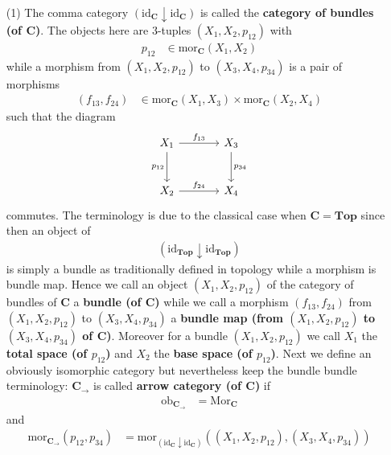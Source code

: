 \begin{enumerate}
\item[(1)]
The comma category $(\mathrm{id}_{\mathbf{C}} \downarrow \mathrm{id}_{\mathbf{C}})$ is called the \textbf{category of bundles (of $\mathbf{C}$)}. The objects here are $3$-tuples $(X_{1},X_{2},p_{12})$ with
\begin{align*}
  p_{12}
  &\in
  \mathrm{mor}_{\mathbf{C}}(X_{1},X_{2})
\end{align*}
while a morphism from $(X_{1},X_{2},p_{12})$ to $(X_{3},X_{4},p_{34})$ is a pair of morphisms
\begin{align*}
  (f_{13},f_{24})
  &\in
  \mathrm{mor}_{\mathbf{C}}(X_{1},X_{3})
  \times
  \mathrm{mor}_{\mathbf{C}}(X_{2},X_{4})
\end{align*}
such that the diagram
\[
\begin{tikzcd}[sep=large]
  X_{1}
  \arrow{r}{f_{13}}
  \arrow[swap]{d}{p_{12}}
  &
  X_{3}
  \arrow{d}{p_{34}}
  \\
  X_{2}
  \arrow{r}{f_{24}}
  &
  X_{4}
\end{tikzcd}
\]
commutes. The terminology is due to the classical case when $\mathbf{C} = \mathbf{Top}$ since then an object of
\begin{align*}
  (\mathrm{id}_{\mathbf{Top}} \downarrow \mathrm{id}_{\mathbf{Top}})
\end{align*}
is simply a bundle as traditionally defined in topology while a morphism is bundle map. Hence we call an object $(X_{1},X_{2},p_{12})$ of the category of bundles of $\mathbf{C}$ a \textbf{bundle (of $\mathbf{C}$)} while we call a morphism $(f_{13},f_{24})$ from $(X_{1},X_{2},p_{12})$ to $(X_{3},X_{4},p_{34})$ a \textbf{bundle map (from $(X_{1},X_{2},p_{12})$ to $(X_{3},X_{4},p_{34})$ of $\mathbf{C}$)}. Moreover for a bundle $(X_{1},X_{2},p_{12})$ we call $X_{1}$ the \textbf{total space (of $p_{12}$)} and $X_{2}$ the \textbf{base space (of $p_{12}$)}. Next we define an obviously isomorphic category but nevertheless keep the bundle bundle terminology: $\mathbf{C}_{\rightarrow}$ is called \textbf{arrow category (of $\mathbf{C}$)} if
\begin{align*}
  \mathrm{ob}_{\mathbf{C}_{\rightarrow}}
  &=
  \mathrm{Mor}_{\mathbf{C}}
\end{align*}
and
\begin{align*}
  \mathrm{mor}_{\mathbf{C}_{\rightarrow}}(p_{12},p_{34})
  &=
  \mathrm{mor}_{(\mathrm{id}_{\mathbf{C}} \downarrow \mathrm{id}_{\mathbf{C}})}
  \left(
    (X_{1},X_{2},p_{12}),
    (X_{3},X_{4},p_{34})
  \right)
\end{align*}

\end{enumerate}
